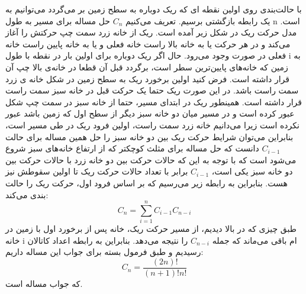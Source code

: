 \p
با حالت‌بندی روی اولین نقطه ای که ریک دوباره به سطح زمین بر می‌گردد می‌توانیم به یک رابطه بازگشتی برسیم. تعریف می‌کنیم \(C_n\) حل مساله برای مسیر به طول n است. مدل حرکت ریک در شکل زیر آمده است. ریک از خانه زرد سمت چپ حرکتش را آغاز می‌کند و در هر حرکت یا به خانه بالا راست خانه فعلی و یا به خانه پایین راست خانه فعلی در صورت وجود می‌رود.
\p
حال اگر ریک دوباره برای اولین بار در نقطه با طول i به زمین که خانه‌های پایین‌ترین سطر است، برگردد قبل آن قطعا در خانه‌ی بالا چپ آن قرار داشته است. فرض کنید اولین برخورد ریک به سطح زمین در شکل خانه ی زرد سمت راست باشد. در این صورت ریک حتما یک حرکت قبل در خانه سبز سمت راست قرار داشته است. همینطور ریک در ابتدای مسیر، حتما از خانه سبز در سمت چپ شکل عبور کرده است و در مسیر میان دو خانه سبز دیگر از سطح اول که زمین باشد عبور نکرده است زیرا می‌دانیم خانه زرد سمت راست، اولین فرود ریک در طی مسیر است، بنابراین می‌توان شرایط حرکت ریک بین دو خانه سبز را حل همین مساله برای حالت \(C_{i-1}\) دانست که حل مساله برای مثلث کوچکتر که از ارتفاع خانه‌های سبز شروع می‌شود است که با توجه به این که حالات حرکت بین دو خانه زرد با حالات حرکت بین دو خانه سبز یکی است، \(C_{i-1}\) برابر با تعداد حالات حرکت ریک تا اولین سقوطش نیز هست. بنابراین به رابطه زیر می‌رسیم که بر اساس فرود اول، حرکت ریک را حالت بندی می‌کند:
\[ C_n = \sum\limits_{i=1}^{n} C_{i-1}C_{n-i} \]طبق چیزی که در بالا دیدیم، از مسیر حرکت ریک،  خانه پس از برخورد اول با زمین در خانه i ام باقی می‌ماند که جمله \(C_{n-i}\) را نتیجه می‌دهد. بنابراین به رابطه اعداد کاتالان رسیدیم و طبق فرمول بسته برای جواب این مساله داریم:
\[ C_n = \frac{(2n)!}{(n+1)!n!} \]که جواب مساله است.
  